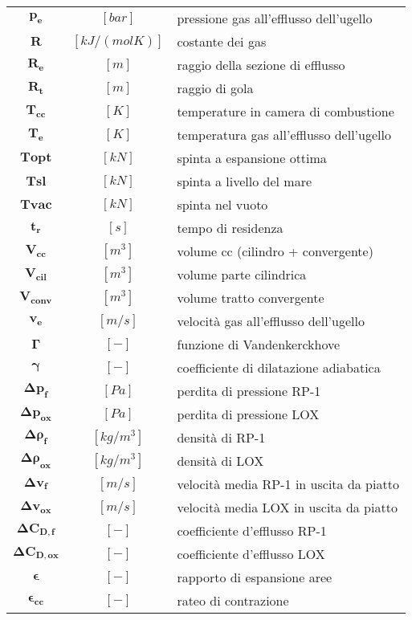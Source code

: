 \begin{multicols}{2}
{\begin{xltabular}{\linewidth}{cc>{\raggedright\arraybackslash}X}
		$\bm{p_e}$ & $[bar]$ & pressione gas all'efflusso dell'ugello \\
		$\bm{R}$ & $[kJ/(molK)]$ & costante dei gas \\
		$\bm{R_e}$ & $[m]$ & raggio della sezione di efflusso \\
        $\bm{R_t}$ & $[m]$ & raggio di gola\\
	    $\bm{T_{cc}}$ & $[K]$ & temperature in camera di combustione \\
		$\bm{T_e}$ & $[K]$ & temperatura gas all'efflusso dell'ugello \\
		$\bm{T{opt}}$ & $[kN]$ & spinta a espansione ottima \\
		$\bm{T{sl}}$ & $[kN]$ & spinta a livello del mare \\
		$\bm{T{vac}}$ & $[kN]$ & spinta nel vuoto \\
	    $\bm{t_{r}}$ & $[s]$ & tempo di residenza \\
		$\bm{V_{cc}}$ & $[m^3]$ & volume cc (cilindro + convergente) \\
		$\bm{V_{cil}}$ & $[m^3]$ & volume parte cilindrica \\
	    $\bm{V_{conv}}$ & $[m^3]$ & volume tratto convergente  \\        
		$\bm{v_e}$ & $[m/s]$ & velocità gas all'efflusso dell'ugello \\
	    $\bm{\Gamma}$ & $[-]$ & funzione di Vandenkerckhove \\
		$\bm{\gamma}$ & $[-]$ & coefficiente di dilatazione adiabatica \\
        	$\bm{\Delta p_f}$ & $[Pa]$ & perdita di pressione RP-1 \\
		$\bm{\Delta p_{ox}}$ & $[Pa]$ & perdita di pressione LOX \\
		$\bm{\Delta \rho_f}$ & $[kg/m^3]$ & densità di RP-1 \\
		$\bm{\Delta \rho_{ox}}$ & $[kg/m^3]$ & densità di LOX \\
		$\bm{\Delta v_f}$ & $[m/s]$ & velocità media RP-1 in uscita da piatto \\
		$\bm{\Delta v_{ox}}$ & $[m/s]$ & velocità media LOX in uscita da piatto \\
		$\bm{\Delta C_{D,f}}$ & $[-]$ & coefficiente d'efflusso RP-1 \\
		$\bm{\Delta C_{D,ox}}$ & $[-]$ & coefficiente d'efflusso LOX \\
		$\bm{\epsilon}$ & $[-]$ & rapporto di espansione aree \\
	    $\bm{\epsilon_{cc}}$ & $[-]$ & rateo di contrazione             \\

\end{xltabular}}
\end{multicols}
